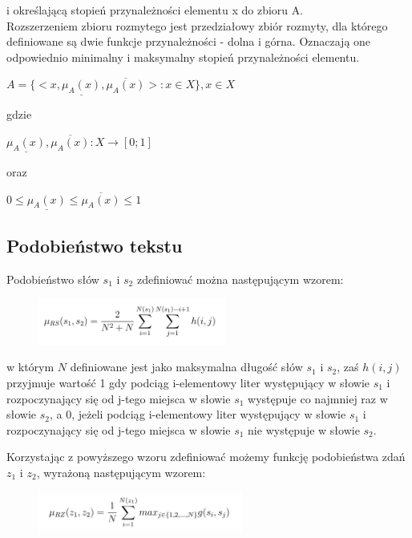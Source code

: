 \documentclass{classrep}
\begin{document}
i określającą stopień przynależności elementu x do zbioru A.\\

Rozszerzeniem zbioru rozmytego jest przedziałowy zbiór rozmyty, dla którego definiowane są dwie funkcje przynależności - dolna i górna. Oznaczają one odpowiednio minimalny i maksymalny stopień przynależności elementu.

\begin{center}
    $A = \{< x, \underline{\mu_A(x)}, \overline{\mu_A(x)} >: x \in X\}, x \in X$
\end{center}

gdzie 

\begin{center}
    $\underline{\mu_A(x)}, \overline{\mu_A(x)}: X \rightarrow [0;1]$
\end{center}

oraz 

\begin{center}
    $0 \le \underline{\mu_A(x)} \le \overline{\mu_A(x)} \le 1$
\end{center}

\subsection{Podobieństwo tekstu}

Podobieństwo słów $s_1$ i $s_2$
zdefiniować można następującym wzorem:

\begin{figure}[H]
    \centering
    \includegraphics[width=0.55\textwidth]{resources/stage3/words.jpg}
\end{figure}

w którym ${N}$ definiowane jest jako maksymalna długość słów $s_1$ i $s_2$, zaś ${h(i, j)}$ przyjmuje wartość 1 gdy podciąg i-elementowy liter występujący w słowie $s_1$ i rozpoczynający się od
j-tego miejsca w słowie $s_1$ występuje co najmniej raz w słowie $s_2$, a 0, jeżeli podciąg i-elementowy liter występujący w słowie $s_1$ i rozpoczynający się od j-tego miejsca w słowie $s_1$ nie występuje w słowie $s_2$.

Korzystając z powyższego wzoru zdefiniować możemy funkcję podobieństwa zdań $z_1$ i $z_2$, wyrażoną następującym wzorem:

\begin{figure}[H]
    \centering
    \includegraphics[width=0.6\textwidth]{resources/stage3/text.jpg}
\end{figure}
\end{document}
